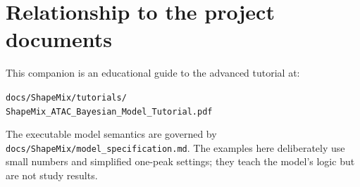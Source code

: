 \documentclass[11pt]{article}
\begin{document}
\section*{Relationship to the project documents}

This companion is an educational guide to the advanced tutorial at:
\begin{center}
\small
\texttt{docs/ShapeMix/tutorials/}\\[-0.15em]
\texttt{ShapeMix\_ATAC\_Bayesian\_Model\_Tutorial.pdf}
\end{center}
The executable model semantics are governed by
\texttt{docs/ShapeMix/model\_specification.md}. The examples here deliberately use
small numbers and simplified one-peak settings; they teach the model's logic but
are not study results.
\end{document}
